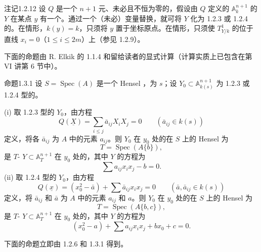 \begin{SGAresult}{注记}{1.2.12}
设 $Q$ 是一个 $n+1$ 元、未必且不恒为零的，假设由 $Q$ 定义的 $\mathbb A_k^{n+1}$ 的 $Y$ 在某点 $y$ 有一个。通过一个（未必）变量替换，就可将 $Y$ 化为 1.2.3 或 1.2.4 的。在情形，$k(y)=k$，只须将 $y$ 置于坐标原点。在情形，只须使 $T^1_{Y/k}$ 的位于直线 $x_i=0$（$1\leq i\leq2m$）上（参见 1.2.9）。
\end{SGAresult}

下面的命题由 R. Elkik 的 1.1.4 和留给读者的显式计算（计算实质上已包含在第 VI 讲第 6 节中）。
\begin{SGAresult}{命题}{1.3.1}
设 $S=\operatorname{Spec}(A)$ 是一个 Hensel ，为 $s$；设 $Y_0\subset\mathbb A_{k(s)}^{n+1}$ 为 1.2.3 或 1.2.4 型的。

(i) 取 1.2.3 型的 $Y_0$，由方程
\[
 Q(\underline X)=\sum_{i\leq j}\bar a_{ij}X_iX_j=0
 \qquad(\bar a_{ij}\in k(s))
\]
定义，将各 $\bar a_{ij}$ 为 $A$ 中的元素 $a_{ij}$。则 $Y_0$ 在 $y_0$ 处的在 $S$ 上的 Hensel 为
\[
 T=\operatorname{Spec}(A\{b\}),
\]
是 $T$- $Y\subset\mathbb A_T^{n+1}$ 在 $y_0$ 处的，其中 $Y$ 的方程为
\[
 \sum a_{ij}x_i x_j-b=0.
\]
(ii) 取 1.2.4 型的 $Y_0$，由方程
\[
 Q(\underline x)=(x_0^2-\bar a)+\sum\bar a_{ij}x_i x_j=0
 \qquad(\bar a,\bar a_{ij}\in k(s))
\]
定义，将 $\bar a_{ij}$ 和 $\bar a$ 为 $A$ 中的元素 $a_{ij}$ 和 $a$。则 $Y_0$ 在 $y_0$ 处的在 $S$ 上的 Hensel 为
\[
 T=\operatorname{Spec}(A\{b,c\}),
\]
是 $T$- $Y\subset\mathbb A_T^{n+1}$ 在 $y_0$ 处的，其中 $Y$ 的方程为
\[
 (x_0^2-a)+\sum a_{ij}x_i x_j+bx_0+c=0.
\]
\end{SGAresult}
下面的命题立即由 1.2.6 和 1.3.1 得到。
